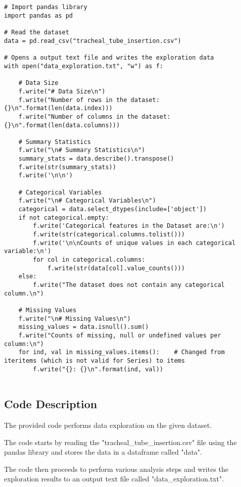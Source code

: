 \documentclass[11pt]{article}
\begin{document}
\begin{verbatim}


# Import pandas library
import pandas as pd

# Read the dataset
data = pd.read_csv("tracheal_tube_insertion.csv")

# Opens a output text file and writes the exploration data
with open("data_exploration.txt", "w") as f:

    # Data Size
    f.write("# Data Size\n")
    f.write("Number of rows in the dataset: {}\n".format(len(data.index)))
    f.write("Number of columns in the dataset: {}\n".format(len(data.columns)))

    # Summary Statistics
    f.write("\n# Summary Statistics\n")
    summary_stats = data.describe().transpose()
    f.write(str(summary_stats))
    f.write('\n\n')

    # Categorical Variables
    f.write("\n# Categorical Variables\n")
    categorical = data.select_dtypes(include=['object'])
    if not categorical.empty:
        f.write('Categorical features in the Dataset are:\n')
        f.write(str(categorical.columns.tolist()))
        f.write('\n\nCounts of unique values in each categorical variable:\n')
        for col in categorical.columns:
            f.write(str(data[col].value_counts()))
    else:
        f.write("The dataset does not contain any categorical column.\n")

    # Missing Values
    f.write("\n# Missing Values\n")
    missing_values = data.isnull().sum()
    f.write("Counts of missing, null or undefined values per column:\n")
    for ind, val in missing_values.items():    # Changed from iteritems (which is not valid for Series) to items
        f.write("{}: {}\n".format(ind, val))


\end{verbatim}

\subsection{Code Description}

The provided code performs data exploration on the given dataset. 

The code starts by reading the "tracheal\_tube\_insertion.csv" file using the pandas library and stores the data in a dataframe called "data".

The code then proceeds to perform various analysis steps and writes the exploration results to an output text file called "data\_exploration.txt".
\end{document}
